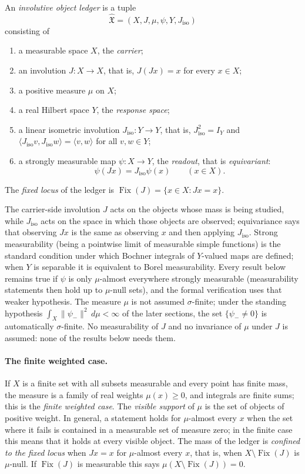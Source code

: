 \documentclass[11pt]{article}
\DeclareMathOperator{\Fix}{Fix}
\newcommand{\psim}{\psi_{-}}
\newcommand{\Jiso}{J_{\mathrm{iso}}}
\newcommand{\IOL}{\hat{\mathfrak{X}}}
\theoremstyle{definition}
\begin{document}
\begin{definition}
\label{def:duality_confinement:involutive-object-ledger}
An \emph{involutive object ledger} is a tuple
\[
  \IOL=(X,J,\mu,\psi,Y,\Jiso)
\]
consisting of
\begin{enumerate}
  \item a measurable space \(X\), the \emph{carrier};
  \item an involution \(J:X\to X\), that is, \(J(Jx)=x\) for every
    \(x\in X\);
  \item a positive measure \(\mu\) on \(X\);
  \item a real Hilbert space \(Y\), the \emph{response space};
  \item a linear isometric involution \(\Jiso:Y\to Y\), that is,
    \(\Jiso^2=I_Y\) and
    \(\langle\Jiso v,\Jiso w\rangle=\langle v,w\rangle\) for all
    \(v,w\in Y\);
  \item a strongly measurable map \(\psi:X\to Y\), the
    \emph{readout}, that is \emph{equivariant}:
    \[
      \psi(Jx)=\Jiso\psi(x)
      \qquad (x\in X).
    \]
\end{enumerate}
The \emph{fixed locus} of the ledger is
\(\Fix(J)=\{x\in X: Jx=x\}\).
\end{definition}

The carrier-side involution \(J\) acts on the objects whose mass is
being studied, while \(\Jiso\) acts on the space in which those objects
are observed; equivariance says that observing \(Jx\) is the same as
observing \(x\) and then applying \(\Jiso\).  Strong measurability
(being a pointwise limit of measurable simple functions) is the
standard condition under which Bochner integrals of \(Y\)-valued maps
are defined; when \(Y\) is separable it is equivalent to Borel
measurability.  Every result below remains true if \(\psi\) is only
\(\mu\)-almost everywhere strongly measurable (measurability statements
then hold up to \(\mu\)-null sets), and the formal verification uses
that weaker hypothesis.  The measure \(\mu\) is not assumed
\(\sigma\)-finite; under the standing hypothesis
\(\int_X\|\psim\|^2\,d\mu<\infty\) of the later sections, the set
\(\{\psim\neq0\}\) is automatically \(\sigma\)-finite.  No measurability of \(J\) and no invariance of \(\mu\)
under \(J\) is assumed: none of the results below needs them.

\paragraph{The finite weighted case.}
If \(X\) is a finite set with all subsets measurable and every point
has finite mass, the measure is a family of real weights
\(\mu(x)\geq0\), and integrals are finite sums; this is the
\emph{finite weighted case}.  The \emph{visible support} of \(\mu\) is the set of objects of
positive weight.  In general, a statement holds for \(\mu\)-almost
every \(x\) when the set where it fails is contained in a measurable
set of measure zero; in the finite case this means that it holds at
every visible object.  The mass of the ledger is \emph{confined to the
fixed locus} when \(Jx=x\) for \(\mu\)-almost every \(x\), that is,
when \(X\setminus\Fix(J)\) is \(\mu\)-null.  If \(\Fix(J)\) is
measurable this says \(\mu(X\setminus\Fix(J))=0\).
\end{document}
